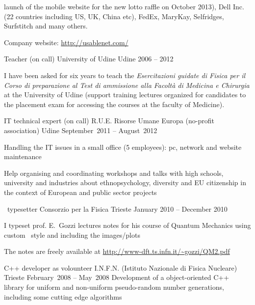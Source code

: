 \begin{cventries}
{\begin{cvitems}
   launch of the mobile website for the new lotto raffle on October 2013), Dell Inc. (22 countries
   including US, UK, China etc), FedEx,
   MaryKay, Selfridges, Surfstitch and many others.
\item Company website: \url{http://usablenet.com/}
	\end{cvitems}
}
\cventry
{Teacher (on call)}
{University of Udine}
{Udine}
{2006 -- 2012}
{
	\begin{cvitems}
	\item 
   I have been asked for six years to teach  the \emph{Esercitazioni guidate di Fisica per il Corso
      di preparazione al Test di ammissione alla Facolt\`a di Medicina e
      Chirurgia} at the University of Udine (support training lectures
   organized
for candidates to the placement exam for accessing the courses at the faculty
of Medicine).
	\end{cvitems}
}
\cventry
{IT technical expert (on call)}
{R.U.E. Risorse Umane Europa (no-profit
   association)}
{Udine}
{September~2011 -- August~2012}
{
	\begin{cvitems}
	\item 
   Handling the IT issues in a small office (5 employees): pc, network and
   website maintenance
    \item 
      Help organising and coordinating workshops and talks with high schools, university and industries about ethnopsychology, diversity and EU citizenship in the context of European and public sector projects 
	\end{cvitems}
   }
\cventry
{\LaTeXe\ typesetter}
{Consorzio per la Fisica}
{Trieste}
{January 2010 -- December 2010}
{   
	\begin{cvitems}
	\item 
I typeset prof. E.~Gozzi lectures notes for his course of Quantum Mechanics using custom \LaTeXe\ style and including the images/plots
\item
   The notes are freely  available at 
   \url{http://www-dft.ts.infn.it/~gozzi/QM2.pdf}
	\end{cvitems}
		}
\cventry
{C++ developer as volounteer}
{I.N.F.N. (Istituto Nazionale di Fisica
   Nucleare)}
{Trieste}
{February~2008 -- May~2008}
{Development of a object-oriented C++ library for uniform and non-uniform
   pseudo-random number generations, including some cutting edge algorithms}

\end{cventries}
